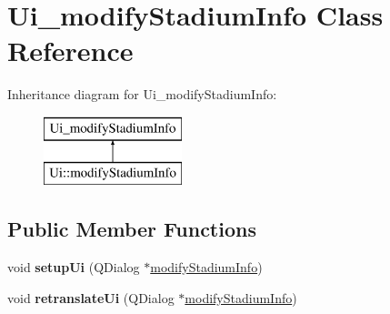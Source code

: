 \hypertarget{class_ui__modify_stadium_info}{}\section{Ui\+\_\+modify\+Stadium\+Info Class Reference}
\label{class_ui__modify_stadium_info}
Inheritance diagram for Ui\+\_\+modify\+Stadium\+Info\+:\begin{figure}[H]
\begin{center}
\leavevmode
\includegraphics[height=2.000000cm]{class_ui__modify_stadium_info}
\end{center}
\end{figure}
\subsection*{Public Member Functions}
\begin{DoxyCompactItemize}
\item 
\mbox{\label{class_ui__modify_stadium_info_a1bc7fa7e327efff0a3686f47591c181f}} 
void {\bfseries setup\+Ui} (Q\+Dialog $\ast$\hyperlink{classmodify_stadium_info}{modify\+Stadium\+Info})
\item 
\mbox{\label{class_ui__modify_stadium_info_a9c3a37f6edfa5d0a4515c32f7df62db2}} 
void {\bfseries retranslate\+Ui} (Q\+Dialog $\ast$\hyperlink{classmodify_stadium_info}{modify\+Stadium\+Info})
\end{DoxyCompactItemize}
